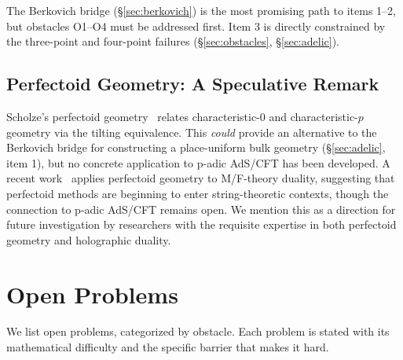 \documentclass[11pt,a4paper]{article}
\begin{document}
The Berkovich bridge (\S\ref{sec:berkovich}) is the most promising path to items 1--2, but obstacles O1--O4 must be addressed first. Item 3 is directly constrained by the three-point and four-point failures (\S\ref{sec:obstacles}, \S\ref{sec:adelic}).

\subsection{Perfectoid Geometry: A Speculative Remark}

Scholze's perfectoid geometry~\cite{Sch11} relates characteristic-0 and characteristic-$p$ geometry via the tilting equivalence. This \emph{could} provide an alternative to the Berkovich bridge for constructing a place-uniform bulk geometry (\S\ref{sec:adelic}, item 1), but no concrete application to p-adic AdS/CFT has been developed. A recent work~\cite{SGF26} applies perfectoid geometry to M/F-theory duality, suggesting that perfectoid methods are beginning to enter string-theoretic contexts, though the connection to p-adic AdS/CFT remains open. We mention this as a direction for future investigation by researchers with the requisite expertise in both perfectoid geometry and holographic duality.

\section{Open Problems}
\label{sec:open}

We list open problems, categorized by obstacle. Each problem is stated with its mathematical difficulty and the specific barrier that makes it hard.
\end{document}
